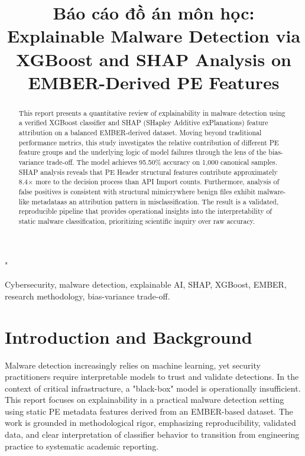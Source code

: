 "\documentclass[conference]{IEEEtran}
\begin{document}
\title{Báo cáo đồ án môn học: Explainable Malware Detection via XGBoost and SHAP Analysis on EMBER-Derived PE Features}

\author{
}

\maketitle

\begin{abstract}
This report presents a quantitative review of explainability in malware detection using a verified XGBoost classifier and SHAP (SHapley Additive exPlanations) feature attribution on a balanced EMBER-derived dataset. Moving beyond traditional performance metrics, this study investigates the relative contribution of different PE feature groups and the underlying logic of model failures through the lens of the bias-variance trade-off. The model achieves 95.50\% accuracy on 1,000 canonical samples. SHAP analysis reveals that PE Header structural features contribute approximately 8.4$\times$ more to the decision process than API Import counts. Furthermore, analysis of false positives is consistent with structural mimicry\text{---}where benign files exhibit malware-like metadata\text{---}as an attribution pattern in misclassification. The result is a validated, reproducible pipeline that provides operational insights into the interpretability of static malware classification, prioritizing scientific inquiry over raw accuracy.
\end{abstract}

\begin{IEEEkeywords}
Cybersecurity, malware detection, explainable AI, SHAP, XGBoost, EMBER, research methodology, bias-variance trade-off.
\end{IEEEkeywords}

\section{Introduction and Background}
Malware detection increasingly relies on machine learning, yet security practitioners require interpretable models to trust and validate detections. In the context of critical infrastructure, a "black-box" model is operationally insufficient. This report focuses on explainability in a practical malware detection setting using static PE metadata features derived from an EMBER-based dataset. The work is grounded in methodological rigor, emphasizing reproducibility, validated data, and clear interpretation of classifier behavior to transition from engineering practice to systematic academic reporting.
\end{document}

